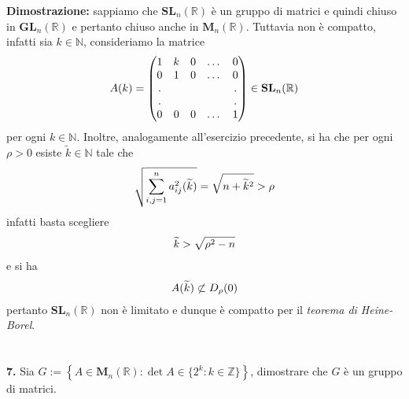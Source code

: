 \documentclass{article}
\begin{document}
\textbf{Dimostrazione:} sappiamo che $\mathbf{SL}_n(\mathbb{R})$ è un gruppo di matrici e quindi chiuso in $\mathbf{GL}_n(\mathbb{R})$ e pertanto chiuso anche in $\mathbf{M}_n(\mathbb{R})$. Tuttavia non è compatto, infatti sia $k \in \mathbb{N}$, consideriamo la matrice
\begin{gather} A(k) =
    \begin{pmatrix}
        1 & k & 0 & \dots & 0 \\
        0 & 1 & 0 & \dots & 0 \\
        . & & & & . \\
        . & & & & . \\
        0 & 0 & 0 & \dots & 1
    \end{pmatrix} \in \mathbf{SL}_n(\mathbb{R}) \notag
\end{gather}
per ogni $k \in \mathbb{N}$. Inoltre, analogamente all'esercizio precedente, si ha che per ogni $\rho > 0$ esiste $\widetilde{k} \in \mathbb{N}$ tale che
\begin{gather}
    \sqrt{\sum_{i, j = 1}^n a^2_{ij}(\widetilde{k})} = \sqrt{n + \widetilde{k}^2} > \rho \notag
\end{gather}
infatti basta scegliere
\begin{gather}
    \widetilde{k} > \sqrt{\rho^2 - n} \notag
\end{gather}
e si ha
\begin{gather}
    A(\widetilde{k}) \not\subset D_\rho(0) \notag
\end{gather}
pertanto $\mathbf{SL}_n(\mathbb{R})$ non è limitato e dunque è compatto per il \textit{teorema di Heine-Borel}. \\ \\ \\
\textbf{7.} Sia $G := \left\{ A \in \mathbf{M}_n(\mathbb{R}) : \det A \in \{ 2^k : k \in \mathbb{Z} \} \right\}$, dimostrare che $G$ è un gruppo di matrici. \\
\end{document}

